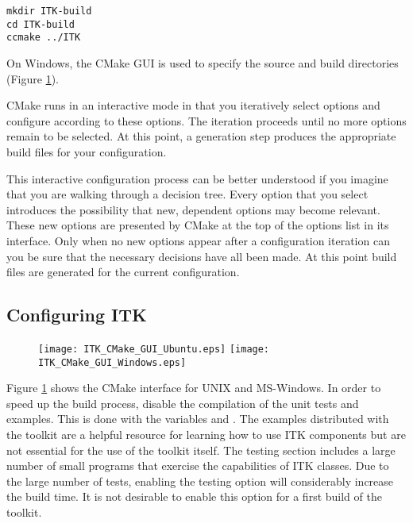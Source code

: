\small
\begin{verbatim}
mkdir ITK-build
cd ITK-build
ccmake ../ITK
\end{verbatim}
\normalsize

On Windows, the CMake GUI is used to specify the source and build
directories (Figure \ref{fig:CMakeGUI}).

CMake runs in an interactive mode in that you iteratively select options and
configure according to these options. The iteration proceeds until no more
options remain to be selected. At this point, a generation step produces the appropriate
build files for your configuration.

This interactive configuration process can be better understood if you
imagine that you are walking through a decision tree.  Every option that you
select introduces the possibility that new, dependent options may become
relevant. These new options are presented by CMake at the top of the options
list in its interface.  Only when no new options appear after a configuration
iteration can you be sure that the necessary decisions have all been made. At
this point build files are generated for the current configuration.

\subsection{Configuring ITK}
\label{sec:ConfigureITK}

\begin{figure}[htb!]
\centering
\texttt{[image: ITK\_CMake\_GUI\_Ubuntu.eps]}
\texttt{[image: ITK\_CMake\_GUI\_Windows.eps]}
\label{fig:CMakeGUI}
\end{figure}

Figure \ref{fig:CMakeGUI} shows the CMake interface for UNIX and MS-Windows.
In order to speed up the build process, disable the compilation
of the unit tests and examples. This is done with the variables
 and .  The examples
distributed with the toolkit are a helpful resource for learning how to use ITK
components but are not essential for the use of the toolkit itself. The testing
section includes a large number of small programs that exercise the
capabilities of ITK classes. Due to the large number of tests, enabling the
testing option will considerably increase the build time.  It is not
desirable to enable this option for a first build of the toolkit.

